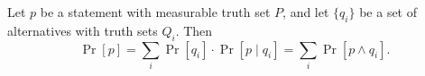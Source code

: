 Let $p$ be a statement with measurable truth set $P$, and let $\{q_i\}$ be a set of alternatives with truth sets $Q_i$. Then
$$\Pr[p] = \sum_i \Pr[q_i] \cdot \Pr[p \mid q_i] = \sum_i \Pr[p \wedge q_i].$$
